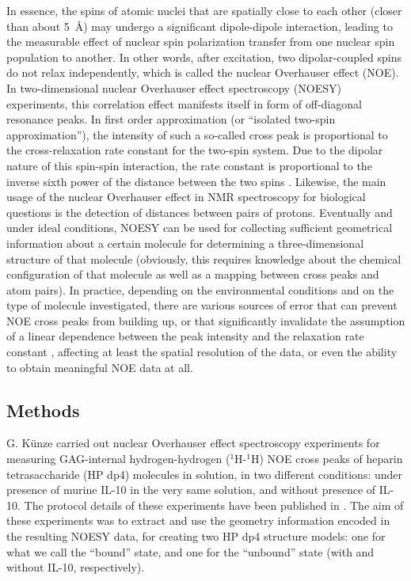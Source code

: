 In essence, the spins of atomic nuclei that are spatially close to each other
(closer than about \SI{5}{\angstrom}) may undergo a significant dipole-dipole
interaction, leading to the measurable effect of nuclear spin polarization
transfer from one nuclear spin population to another. In other words, after
excitation, two dipolar-coupled spins do not relax independently, which is
called the nuclear Overhauser effect (NOE). In two-dimensional nuclear
Overhauser effect spectroscopy (NOESY) experiments, this correlation effect
manifests itself in form of off-diagonal resonance peaks. In first order
approximation (or \enquote{isolated two-spin approximation}), the intensity of
such a so-called cross peak is proportional to the cross-relaxation rate
constant for the two-spin system. Due to the dipolar nature of this spin-spin
interaction, the rate constant is proportional to the inverse sixth power of
the distance between the two spins \cite{neuhaus2000_noe}. Likewise, the main
usage of the nuclear Overhauser effect in NMR spectroscopy for biological
questions is the detection of distances between pairs of protons. Eventually and
under ideal conditions, NOESY can be used for collecting sufficient geometrical
information about a certain molecule for determining a three-dimensional
structure of that molecule (obviously, this requires knowledge about the
chemical configuration of that molecule as well as a mapping between cross peaks
and atom pairs). In practice, depending on the environmental conditions and on
the type of molecule investigated, there are various sources of error that can
prevent NOE cross peaks from building up, or that significantly invalidate the
assumption of a linear dependence between the peak intensity and the relaxation
rate constant \cite{palmer_online_nmr_relaxation}, affecting at least the
spatial resolution of the data, or even the ability to obtain meaningful NOE
data at all.


\subsection{Methods} \label{nmr:methdos} G. Künze carried out nuclear Overhauser
effect spectroscopy experiments for measuring GAG-internal hydrogen-hydrogen
(${}^1$H-${}^1$H) NOE cross peaks of heparin tetrasaccharide (HP dp4) molecules
in solution, in two different conditions: under presence of murine IL-10 in the
very same solution, and without presence of IL-10. The protocol details of these
experiments have been published in \cite{kuenze_gehrcke_2014}. The aim of these
experiments was to extract and use the geometry information encoded in the
resulting NOESY data, for creating two HP dp4 structure models: one for what we
call the \enquote{bound} state, and one for the \enquote{unbound} state (with
and without IL-10, respectively).


